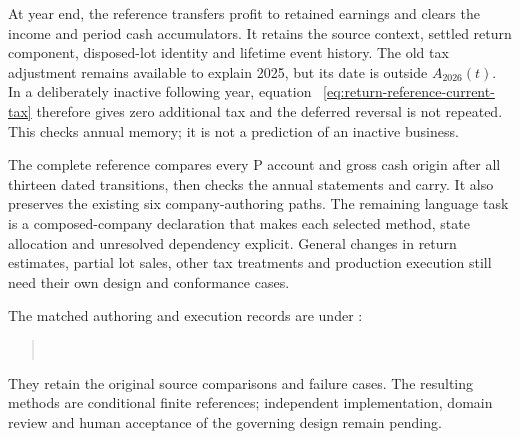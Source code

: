 At year end, the reference transfers profit to retained earnings and clears
the income and period cash accumulators. It retains the source context,
settled return component, disposed-lot identity and lifetime event history.
The old tax adjustment remains available to explain 2025, but its date is
outside $A_{2026}(t)$. In a deliberately inactive following year, equation~
\eqref{eq:return-reference-current-tax} therefore gives zero additional tax
and the deferred reversal is not repeated. This checks annual memory; it is
not a prediction of an inactive business.

The complete reference compares every P account and gross cash origin after
all thirteen dated transitions, then checks the annual statements and carry.
It also preserves the existing six company-authoring paths. The remaining
language task is a composed-company declaration that makes each selected
method, state allocation and unresolved dependency explicit. General changes
in return estimates, partial lot sales, other tax treatments and production
execution still need their own design and conformance cases.

The matched authoring and execution records are under
:
\begin{quote}\small
{}\\
\end{quote}
They retain
the original source comparisons and failure cases. The resulting methods are
conditional finite references; independent implementation, domain review and
human acceptance of the governing design remain pending.
